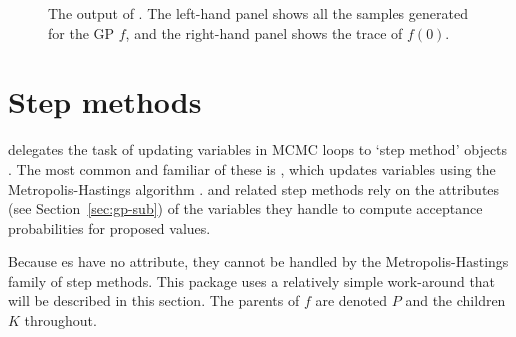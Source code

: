 \documentclass[article]{jss}
\begin{document}
\begin{figure}
    \centering
    \caption{The output of . The left-hand panel shows all the samples generated for the GP $f$, and the right-hand panel shows the trace of $f(0)$.}
    \label{fig:MCMCOutput}
\end{figure}
 

\section{Step methods}
\label{sec:step-methods}
 delegates the task of updating variables in MCMC loops to `step method' objects \citep{pymc}. The most common and familiar of these is , which updates variables using the Metropolis-Hastings algorithm \citep{gamerman}.  and related step methods rely on the  attributes (see Section~\ref{sec:gp-sub}) of the variables they handle to compute acceptance probabilities for proposed values. 

Because es have no  attribute, they cannot be handled by the Metropolis-Hastings family of step methods. This package uses a relatively simple work-around that will be described in this section. The parents of $f$ are denoted $P$ and the children $K$ throughout.
\end{document}
